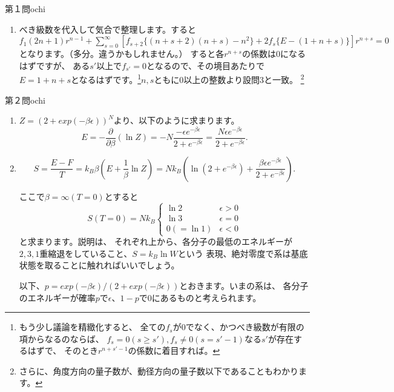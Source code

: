 \begin{answer}{第１問}{ochi}
\begin{enumerate}
\item
  べき級数を代入して気合で整理します。すると
  $f_1(2n+1)r^{n-1}+\sum_{s=0}^\infty [
  f_{s+2}\{ (n+s+2)(n+s)-n^2 \} +2f_s\{
  E-(1+n+s) \} ] r^{n+s}=0$となります。（多分。違うかもしれません。）
  すると各$r^{n+s}$の係数は0になるはずですが、
  ある$s'$以上で$f_{s'}=0$となるので、その境目あたりで
  $E=1+n+s$となるはずです。\footnote{もう少し議論を精緻化すると、
  全ての$f_s$が0でなく、かつべき級数が有限の項からなるのならば、
  $f_s=0(s\geq s'),f_s\neq 0(s=s'-1)$なる$s'$が存在するはずで、
  そのとき$r^{n+s'-1}$の係数に着目すれば。}$n,s$ともに0以上の整数より設問3と一致。
  \footnote{さらに、角度方向の量子数が、動径方向の量子数以下であることもわかります。}
\end{enumerate}
\end{answer}

\begin{answer}{第２問}{ochi}
\begin{enumerate}
\item
  $Z=(2+exp(-\beta \epsilon))^N$より、以下のように求まります。
  \begin{equation}
    E=-\frac{\partial}{\partial \beta}(\ln Z)
      =-N\frac{-\epsilon e^{-\beta \epsilon}}{2+e^{-\beta \epsilon}}
      =\frac{N\epsilon e^{-\beta \epsilon}}{2+e^{-\beta \epsilon}}.
  \end{equation}

\item
  \begin{equation}
    S=\frac{E-F}{T}=k_B \beta (E+\frac{1}{\beta}\ln Z)
    =Nk_B \left( \ln{(2+e^{-\beta \epsilon})} +\frac{\beta \epsilon e^{-\beta \epsilon}}
    {2+e^{-\beta \epsilon}} \right).
  \end{equation}

  ここで$\beta = \infty(T = 0)$とすると
  \begin{equation}
    S(T=0)=Nk_B\begin{cases}
      \ln 2 & \epsilon >0\\
      \ln 3 & \epsilon =0\\
      0(=\ln 1) & \epsilon <0
    \end{cases}
  \end{equation}
  と求まります。説明は、
  それぞれ上から、各分子の最低のエネルギーが$2,3,1$重縮退をしていること、$S=k_B\ln W$という
  表現、絶対零度で系は基底状態を取ることに触れればいいでしょう。

  以下、$p=exp(-\beta \epsilon)/(2+exp(-\beta \epsilon))$とおきます。いまの系は、
  各分子のエネルギーが確率$p$で$\epsilon$、$1-p$で$0$にあるものと考えられます。


\end{enumerate}
\end{answer}
